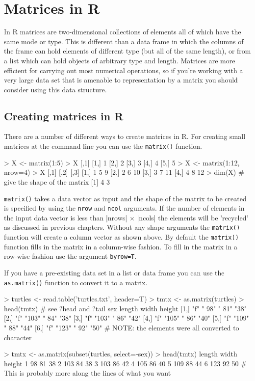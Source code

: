 
\section{Matrices in R}

In R matrices are two-dimensional collections of elements all of which
have the same mode or type. This is different than a data frame in which
the columns of the frame can hold elements of different type (but all of
the same length), or from a list which can hold objects of arbitrary
type and length. Matrices are more efficient for carrying out most
numerical operations, so if you're working with a very large data set
that is amenable to representation by a matrix you should consider using
this data structure.

\subsection{Creating matrices in R}

There are a number of different ways to create matrices in R. For
creating small matrices at the command line you can use the
\lstinline!matrix()! function.

\begin{R}
> X <- matrix(1:5)
> X
      [,1]
 [1,]    1
 [2,]    2
 [3,]    3
 [4,]    4
 [5,]    5
> X <- matrix(1:12, nrow=4)
> X
     [,1] [,2] [,3]
[1,]    1    5    9
[2,]    2    6   10
[3,]    3    7   11
[4,]    4    8   12
> dim(X) # give the shape of the matrix
[1] 4 3
\end{R}
\lstinline!matrix()! takes a data vector as input and the shape of the
matrix to be created is specified by using the \lstinline!nrow! and
\lstinline!ncol! arguments. If the number of elements in the input data
vector is less than |nrows| $\times$ |ncols| the
elements will be 'recycled' as discussed in previous chapters. Without
any shape arguments the \lstinline!matrix()! function will create a
column vector as shown above. By default the \lstinline!matrix()!
function fills in the matrix in a column-wise fashion. To fill in the
matrix in a row-wise fashion use the argument \lstinline!byrow=T!.

If you have a pre-existing data set in a list or data frame you can use
the \lstinline!as.matrix()! function to convert it to a matrix.

\begin{R}
> turtles <- read.table('turtles.txt', header=T)
> tmtx <- as.matrix(turtles)
> head(tmtx)   # see ?head and ?tail
     sex length width height
[1,] "f" " 98"  " 81" "38"  
[2,] "f" "103"  " 84" "38"  
[3,] "f" "103"  " 86" "42"  
[4,] "f" "105"  " 86" "40"  
[5,] "f" "109"  " 88" "44"  
[6,] "f" "123"  " 92" "50" 
# NOTE: the elements were all converted to character

> tmtx <- as.matrix(subset(turtles, select=-sex))
> head(tmtx)
  length width height
1     98    81     38
2    103    84     38
3    103    86     42
4    105    86     40
5    109    88     44
6    123    92     50
# This is probably more along the lines of what you want
\end{R}

